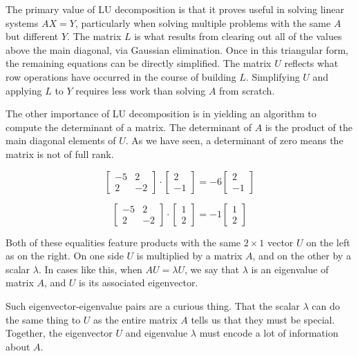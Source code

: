 \documentclass[10pt]{article}
\begin{document}
The primary value of LU decomposition is that it proves useful in solving linear systems \(AX=Y\), particularly when solving multiple problems with the same \(A\) but different \(Y\). The matrix \(L\) is what results from clearing out all of the values above the main diagonal, via Gaussian elimination. Once in this triangular form, the remaining equations can be directly simplified. The matrix \(U\) reflects what row operations have occurred in the course of building \(L\). Simplifying \(U\) and applying \(L\) to \(Y\) requires less work than solving \(A\) from scratch.

The other importance of LU decomposition is in yielding an algorithm to compute the determinant of a matrix. The determinant of \(A\) is the product of the main diagonal elements of \(U\). As we have seen, a determinant of zero means the matrix is not of full rank.

\[
\begin{bmatrix}
-5 & 2 \\
2 & -2
\end{bmatrix} \cdot
\begin{bmatrix}
2 \\
-1
\end{bmatrix} = -6
\begin{bmatrix}
2 \\
-1
\end{bmatrix}
\]

\[
\begin{bmatrix}
-5 & 2 \\
2 & -2
\end{bmatrix} \cdot
\begin{bmatrix}
1 \\
2
\end{bmatrix} = -1
\begin{bmatrix}
1 \\
2
\end{bmatrix}
\]

Both of these equalities feature products with the same \(2 \times 1\) vector \(U\) on the left as on the right. On one side \(U\) is multiplied by a matrix \(A\), and on the other by a scalar \(\lambda\). In cases like this, when \(AU=\lambda U\), we say that \(\lambda\) is an eigenvalue of matrix \(A\), and \(U\) is its associated eigenvector.

Such eigenvector-eigenvalue pairs are a curious thing. That the scalar \(\lambda\) can do the same thing to \(U\) as the entire matrix \(A\) tells us that they must be special. Together, the eigenvector \(U\) and eigenvalue \(\lambda\) must encode a lot of information about \(A\).
\end{document}
